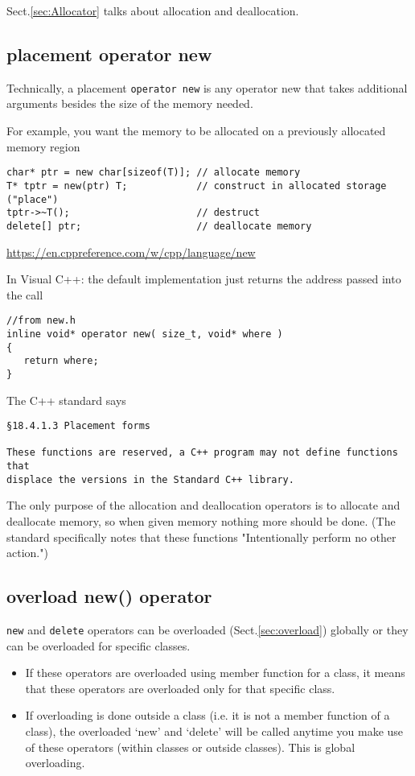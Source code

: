 Sect.\ref{sec:Allocator} talks about allocation and deallocation.


\subsection{placement operator new}

Technically, a placement \verb!operator new! is any operator new that takes additional
arguments besides the size of the memory needed.

For example, you want the memory to be allocated on a previously allocated memory region
\begin{lstlisting}
char* ptr = new char[sizeof(T)]; // allocate memory
T* tptr = new(ptr) T;            // construct in allocated storage ("place")
tptr->~T();                      // destruct
delete[] ptr;                    // deallocate memory
\end{lstlisting}
\url{https://en.cppreference.com/w/cpp/language/new}

In Visual C++:  the default implementation just returns the address passed into the call
\begin{lstlisting}
//from new.h
inline void* operator new( size_t, void* where )
{
   return where;
}
\end{lstlisting}

The C++ standard says
\begin{verbatim}
§18.4.​1.3 Placement forms

These functions are reserved, a C++ program may not define functions that
displace the versions in the Standard C++ library.

\end{verbatim}

The only purpose of the allocation and deallocation operators is to allocate and
deallocate memory, so when given memory nothing more should be done.
(The standard specifically notes that these functions "Intentionally perform no
other action.")



\subsection{overload new() operator}
\label{sec:new()-overload-it}



\verb!new! and \verb!delete! operators can be overloaded
(Sect.\ref{sec:overload}) globally or they can be overloaded for specific
classes.
\begin{itemize}

  \item   If these operators are overloaded using member function for a class,
  it means that these operators are overloaded only for that specific class.


  \item   If overloading is done outside a class (i.e. it is not a member
  function of a class), the overloaded ‘new’ and ‘delete’ will be called anytime
  you make use of these operators (within classes or outside classes). This is
  global overloading.

\end{itemize}

